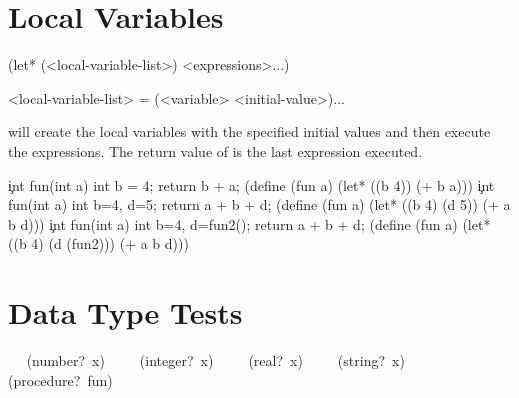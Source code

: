 \vfil\break

\section{Local Variables}

\bdisplay
(let*  (<local-variable-list>)
       <expressions>...)

<local-variable-list> = (<variable>  <initial-value>)...
\edisplay

 will create the local variables with the specified initial values
and then execute the expressions.  The return value of  is the
last expression executed.

\bigskip

\c
int  fun(int a)
\op
    int b = 4;
    return b + a;
\cp
\scheme
(define (fun a)
    (let* ((b 4))
        (+ b a)))
\endcode
\c
int  fun(int a)
\op
    int b=4, d=5;
    return a + b + d;
\cp
\scheme
(define (fun a)
    (let* ((b 4)
           (d 5))
         (+ a b d)))
\endcode
\c
int  fun(int a)
\op
    int b=4, d=fun2();
    return a + b + d;
\cp
\scheme
(define (fun a)
    (let* ((b 4)
           (d (fun2)))
         (+ a b d)))
\endcode

\section{Data Type Tests}

\split \ ~	(number?\ x) ~
\split \ ~	(integer?\ x) ~
\split \ ~	(real?\ x) ~
\split \ ~	(string?\ x) ~
\split \ ~	(procedure?\ fun) ~


\bye

